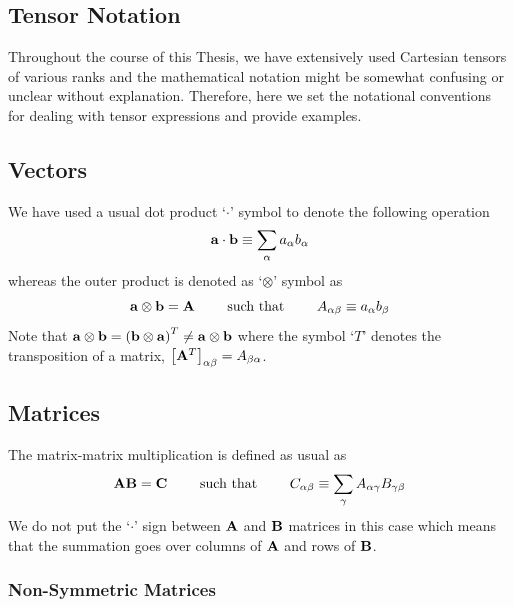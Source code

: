 \documentclass[a4paper,titlepage,twoside,fleqn,12pt]{book}
\begin{document}
\begin{appendices}

\chapter{Tensor Notation\label{a:tensor-notation}}

Throughout the course of this Thesis, we have extensively used Cartesian tensors
of various ranks and the mathematical notation might be somewhat confusing
or unclear without explanation. Therefore, here we set the notational conventions
for dealing with tensor expressions and provide examples.

\section{Vectors}

We have used a usual dot product `$\cdot$' symbol to denote the following
operation
%
\begin{equation}
 {\bf a} \cdot {\bf b} \equiv \sum_\alpha a_\alpha b_\alpha
\end{equation}
%
whereas the outer product is denoted as `$\otimes$' symbol as
%
\begin{equation}
 {\bf a} \otimes {\bf b} = {\bf A} 
 \qquad\text{ such that } 
 \qquad A_{\alpha\beta}  \equiv a_\alpha b_\beta
\end{equation}
%
Note that ${\bf a} \otimes {\bf b} = \left( {\bf b} \otimes {\bf a} \right)^T \ne 
{\bf a} \otimes {\bf b}$ where the symbol `$T$' denotes the transposition 
of a matrix, $\left[ {\bf A}^T\right]_{\alpha\beta}=A_{\beta\alpha}$.

\section{Matrices}

The matrix\hyp{}matrix multiplication is defined as usual as
%
\begin{equation}
 {\bf A} {\bf B} = {\bf C} 
 \qquad\text{ such that } 
 \qquad C_{\alpha\beta}  \equiv \sum_\gamma A_{\alpha\gamma} B_{\gamma\beta} 
\end{equation}
%
We do not put the `$\cdot$' sign between ${\bf A}$ and ${\bf B}$ matrices 
in this case which means that the summation
goes over columns of ${\bf A}$ and rows of ${\bf B}$.

\subsection{Non-Symmetric Matrices}


\end{appendices}
\end{document}
